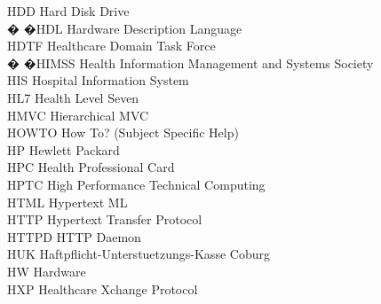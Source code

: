 \begin{tabbing}
    \>HDD \>\>Hard Disk Drive\\

 � �\>HDL \>\>Hardware Description Language\\


    \>HDTF \>\>Healthcare Domain Task Force\\


 � �\>HIMSS \>\>Health Information Management and Systems Society\\


    \>HIS \>\>Hospital Information System\\

    \>HL7 \>\>Health Level Seven\\

    \>HMVC \>\>Hierarchical MVC\\

    \>HOWTO \>\>How To? (Subject Specific Help)\\

    \>HP \>\>Hewlett Packard\\

    \>HPC \>\>Health Professional Card\\

    \>HPTC \>\>High Performance Technical Computing\\

    \>HTML \>\>Hypertext ML\\

    \>HTTP \>\>Hypertext Transfer Protocol\\


    \>HTTPD \>\>HTTP Daemon\\


    \>HUK \>\>Haftpflicht-Unterstuetzungs-Kasse Coburg\\

    \>HW \>\>Hardware\\

    \>HXP \>\>Healthcare Xchange Protocol\\


\end{tabbing}
